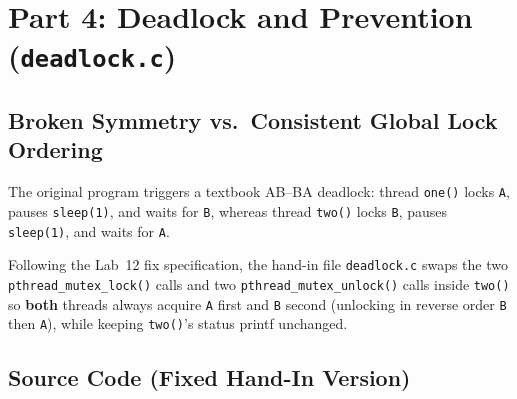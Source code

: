\documentclass[12pt,a4paper]{article}
\begin{document}
\section{Part 4: Deadlock and Prevention (\texttt{deadlock.c})}

\subsection{Broken Symmetry vs.\ Consistent Global Lock Ordering}
The original program triggers a textbook AB--BA deadlock: thread \texttt{one()} locks \texttt{A}, pauses \texttt{sleep(1)}, and waits for \texttt{B}, whereas thread \texttt{two()} locks \texttt{B}, pauses \texttt{sleep(1)}, and waits for \texttt{A}.

Following the Lab~12 fix specification, the hand-in file \texttt{deadlock.c} swaps the two \texttt{pthread\_\allowbreak mutex\_\allowbreak lock()} calls and two \texttt{pthread\_\allowbreak mutex\_\allowbreak unlock()} calls inside \texttt{two()} so \textbf{both} threads always acquire \texttt{A} first and \texttt{B} second (unlocking in reverse order \texttt{B} then \texttt{A}), while keeping \texttt{two()}'s status printf unchanged.

\subsection{Source Code (Fixed Hand-In Version)}


\newpage
\end{document}
